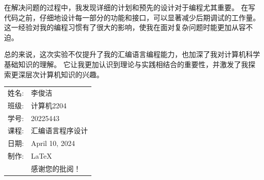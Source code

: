 \documentclass[12pt]{article}
\begin{document}
在解决问题的过程中，我发现详细的计划和预先的设计对于编程尤其重要。
在写代码之前，仔细地设计每一部分的功能和接口，可以显著减少后期调试的工作量。
这一经验对我的编程习惯有了很大的影响，使我在面对复杂问题时能更加从容不迫。

总的来说，这次实验不仅提升了我的汇编语言编程能力，也加深了我对计算机科学基础知识的理解。
它让我更加认识到理论与实践相结合的重要性，并激发了我探索更深层次计算机知识的兴趣。
\begin{flushright}\begin{tabular}{rl}
    姓名: & 李俊洁\\
    班级: & 计算机2204 \\
    学号: & 20225443 \\
    课程: & 汇编语言程序设计 \\
    日期: & April 10, 2024 \\
    制作: & \LaTeX \\
    & 感谢您的批阅！
\end{tabular}\end{flushright}
\end{document}
